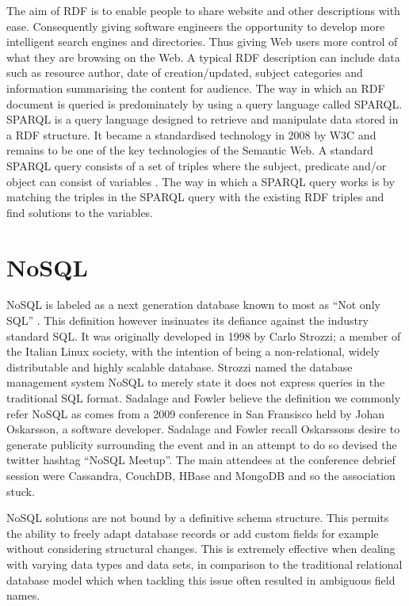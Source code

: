 The aim of RDF is to enable people to share website and other descriptions with ease. Consequently giving software engineers the opportunity to develop more intelligent search engines and directories. Thus giving Web users more control of what they are browsing on the Web. A typical RDF description can include data such as resource author, date of creation/updated, subject categories and information summarising the content for audience. The way in which an RDF document is queried is predominately by using a query language called SPARQL. SPARQL is a query language designed to retrieve and manipulate data stored in a RDF structure. It became a standardised technology in 2008 by W3C and remains to be one of the key technologies of the Semantic Web. A standard SPARQL query consists of a set of triples where the subject, predicate and/or object can consist of variables \cite{7}. The way in which a SPARQL query works is by matching the triples in the SPARQL query with the existing RDF triples and find solutions to the variables.

\section{NoSQL}\label{nosql}
NoSQL is labeled as a next generation database known to most as ``Not only SQL'' \cite{nosql1}. This definition however insinuates its defiance against the industry standard SQL. It was originally developed in 1998 by Carlo Strozzi; a member of the Italian Linux society, with the intention of being a non-relational, widely distributable and highly scalable database. Strozzi named the database management system NoSQL to merely state it does not express queries in the traditional SQL format. Sadalage and Fowler believe the definition we commonly refer NoSQL as comes from a 2009 conference in San Fransisco held by Johan Oskarsson, a software developer. Sadalage and Fowler recall Oskarssons desire to generate publicity surrounding the event and in an attempt to do so devised the twitter hashtag ``NoSQL Meetup''. The main attendees at the conference debrief session were Cassandra, CouchDB, HBase and MongoDB and so the association stuck. \cite{nosql1}

NoSQL solutions are not bound by a definitive schema structure. This permits the ability to freely adapt database records or add custom fields for example without considering structural changes. This is extremely effective when dealing with varying data types and data sets, in comparison to the traditional relational database model which when tackling this issue often resulted in ambiguous field names.  \cite{nosql1}

